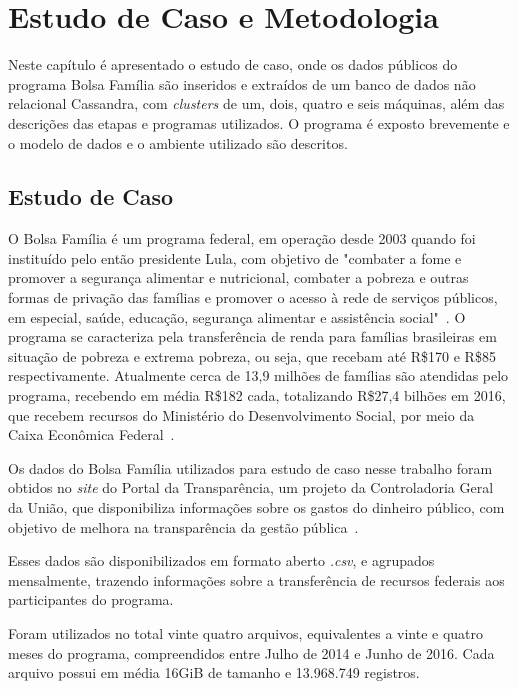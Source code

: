 

\chapter{Estudo de Caso e Metodologia}

Neste capítulo é apresentado o estudo de caso, onde os dados públicos do programa Bolsa Família são inseridos e extraídos de um banco de dados não relacional Cassandra, com \emph{clusters} de um, dois, quatro e seis máquinas, além das descrições das etapas e programas utilizados. O programa é exposto brevemente e o modelo de dados e o ambiente utilizado são descritos.

\section{Estudo de Caso}
O Bolsa Família é um programa federal, em operação desde 2003 quando foi instituído pelo então presidente Lula, com objetivo de "combater a fome e promover a segurança alimentar e nutricional, combater a pobreza e outras formas de privação das famílias e promover o acesso à rede de serviços públicos, em especial, saúde, educação, segurança alimentar e assistência social"~\cite{caixa-bolsafamilia}. 
O programa se caracteriza pela transferência de renda para famílias brasileiras em situação de pobreza e extrema pobreza, ou seja, que recebam até R\$170 e R\$85 respectivamente. Atualmente cerca de 13,9 milhões de famílias são atendidas pelo programa, recebendo em média R\$182 cada, totalizando R\$27,4 bilhões em 2016, que recebem recursos do Ministério do Desenvolvimento Social, por meio da Caixa Econômica Federal~\cite{gov-bolsafamilia1, gov-bolsafamilia2}.

Os dados do Bolsa Família utilizados para estudo de caso nesse trabalho foram obtidos no \emph{site} do Portal da Transparência, um projeto da Controladoria Geral da União, que disponibiliza informações sobre os gastos do dinheiro público, com objetivo de melhora na transparência da gestão pública~\cite{sobreportaldatransparencia}. 

Esses dados são disponibilizados em formato aberto \emph{.csv}, e agrupados mensalmente, trazendo informações sobre a transferência de recursos federais aos participantes do programa. 

Foram utilizados no total vinte quatro arquivos, equivalentes a vinte e quatro meses do programa, compreendidos entre Julho de 2014 e Junho de 2016. Cada arquivo possui em média 16GiB de tamanho e 13.968.749 registros.

